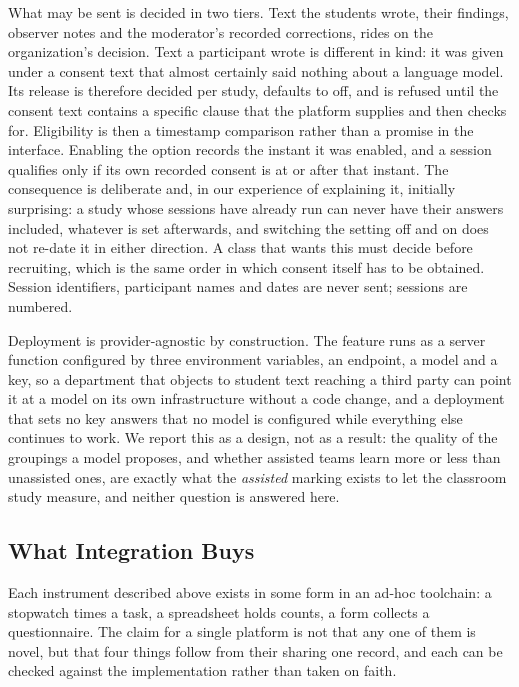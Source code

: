 \documentclass[conference]{IEEEtran}
\begin{document}
What may be sent is decided in two tiers. Text the students wrote, their
findings, observer notes and the moderator's recorded corrections, rides on the
organization's decision. Text a participant wrote is different in kind: it was
given under a consent text that almost certainly said nothing about a language
model. Its release is therefore decided per study, defaults to off, and is
refused until the consent text contains a specific clause that the platform
supplies and then checks for. Eligibility is then a timestamp comparison rather
than a promise in the interface. Enabling the option records the instant it was
enabled, and a session qualifies only if its own recorded consent is at or
after that instant. The consequence is deliberate and, in our experience of
explaining it, initially surprising: a study whose sessions have already run can
never have their answers included, whatever is set afterwards, and switching
the setting off and on does not re-date it in either direction. A class that
wants this must decide before recruiting, which is the same order in which
consent itself has to be obtained. Session identifiers, participant names and
dates are never sent; sessions are numbered.

Deployment is provider-agnostic by construction. The feature runs as a server
function configured by three environment variables, an endpoint, a model and a
key, so a department that objects to student text reaching a third party can
point it at a model on its own infrastructure without a code change, and a
deployment that sets no key answers that no model is configured while
everything else continues to work. We report this as a design, not as a result:
the quality of the groupings a model proposes, and whether assisted teams
learn more or less than unassisted ones, are exactly what the \emph{assisted}
marking exists to let the classroom study measure, and neither question is
answered here.

\subsection{What Integration Buys}
\label{sec:integration}
Each instrument described above exists in some form in an ad-hoc toolchain: a
stopwatch times a task, a spreadsheet holds counts, a form collects a
questionnaire. The claim for a single platform is not that any one of them is
novel, but that four things follow from their sharing one record, and each can
be checked against the implementation rather than taken on faith.
\end{document}
